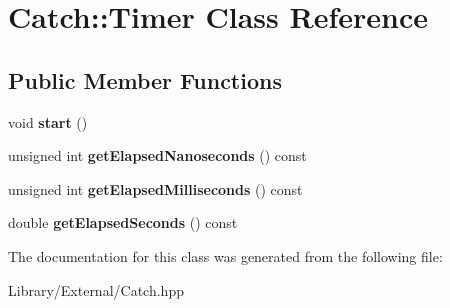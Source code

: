 \hypertarget{class_catch_1_1_timer}{}\section{Catch\+:\+:Timer Class Reference}
\label{class_catch_1_1_timer}
\subsection*{Public Member Functions}
\begin{DoxyCompactItemize}
\item 
\hypertarget{class_catch_1_1_timer_a0a56e879e43f36c102bf9ea8b5fc8b72}{}void {\bfseries start} ()\label{class_catch_1_1_timer_a0a56e879e43f36c102bf9ea8b5fc8b72}

\item 
\hypertarget{class_catch_1_1_timer_ad88ea4dc75a07e5c6d870f5f979663a1}{}unsigned int {\bfseries get\+Elapsed\+Nanoseconds} () const \label{class_catch_1_1_timer_ad88ea4dc75a07e5c6d870f5f979663a1}

\item 
\hypertarget{class_catch_1_1_timer_a4cf3f9fbee9c76e87d989d9bc6913b68}{}unsigned int {\bfseries get\+Elapsed\+Milliseconds} () const \label{class_catch_1_1_timer_a4cf3f9fbee9c76e87d989d9bc6913b68}

\item 
\hypertarget{class_catch_1_1_timer_a8500ef3481a9bf6ae81337972d9f95a3}{}double {\bfseries get\+Elapsed\+Seconds} () const \label{class_catch_1_1_timer_a8500ef3481a9bf6ae81337972d9f95a3}

\end{DoxyCompactItemize}


The documentation for this class was generated from the following file\+:\begin{DoxyCompactItemize}
\item 
Library/\+External/Catch.\+hpp\end{DoxyCompactItemize}
